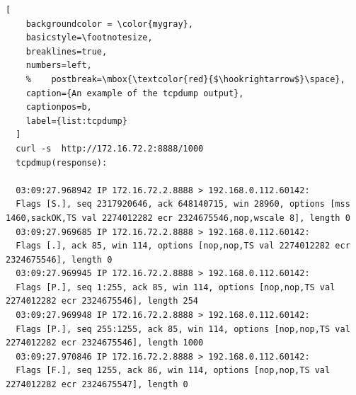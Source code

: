 \begin{lstlisting}[
    backgroundcolor = \color{mygray},
    basicstyle=\footnotesize,
    breaklines=true,
    numbers=left,
    %    postbreak=\mbox{\textcolor{red}{$\hookrightarrow$}\space},
    caption={An example of the tcpdump output},
    captionpos=b,
    label={list:tcpdump}
  ]
  curl -s  http://172.16.72.2:8888/1000
  tcpdmup(response):

  03:09:27.968942 IP 172.16.72.2.8888 > 192.168.0.112.60142:
  Flags [S.], seq 2317920646, ack 648140715, win 28960, options [mss 1460,sackOK,TS val 2274012282 ecr 2324675546,nop,wscale 8], length 0
  03:09:27.969685 IP 172.16.72.2.8888 > 192.168.0.112.60142:
  Flags [.], ack 85, win 114, options [nop,nop,TS val 2274012282 ecr 2324675546], length 0
  03:09:27.969945 IP 172.16.72.2.8888 > 192.168.0.112.60142:
  Flags [P.], seq 1:255, ack 85, win 114, options [nop,nop,TS val 2274012282 ecr 2324675546], length 254
  03:09:27.969948 IP 172.16.72.2.8888 > 192.168.0.112.60142:
  Flags [P.], seq 255:1255, ack 85, win 114, options [nop,nop,TS val 2274012282 ecr 2324675546], length 1000
  03:09:27.970846 IP 172.16.72.2.8888 > 192.168.0.112.60142:
  Flags [F.], seq 1255, ack 86, win 114, options [nop,nop,TS val 2274012282 ecr 2324675547], length 0
\end{lstlisting}

